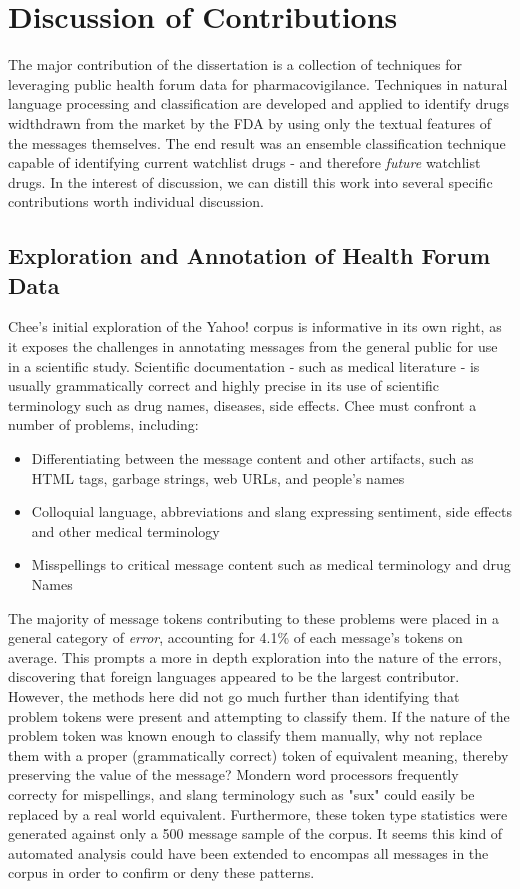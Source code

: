 \documentclass[twoside,11pt]{article}
\begin{document}
\section{Discussion of Contributions}
The major contribution of the dissertation is a collection of techniques for leveraging public health forum data for pharmacovigilance. Techniques in natural language processing and classification are developed and applied to identify drugs widthdrawn from the market by the FDA by using only the textual features of the messages themselves. The end result was an ensemble classification technique capable of identifying current watchlist drugs - and therefore \textit{future} watchlist drugs. In the interest of discussion, we can distill this work into several specific contributions worth individual discussion.

\subsection{Exploration and Annotation of Health Forum Data}
Chee's initial exploration of the Yahoo! corpus is informative in its own right, as it exposes the challenges in annotating messages from the general public for use in a scientific study. Scientific documentation - such as medical literature - is usually grammatically correct and highly precise in its use of scientific terminology such as drug names, diseases, side effects. Chee must confront a number of problems, including:
\begin{itemize}
  \item Differentiating between the message content and other artifacts, such as HTML tags, garbage strings, web URLs, and people's names
  \item Colloquial language, abbreviations and slang expressing sentiment, side effects and other medical terminology
  \item Misspellings to critical message content such as medical terminology and drug Names
\end{itemize}

The majority of message tokens contributing to these problems were placed in a general category of \textit{error}, accounting for 4.1\% of each message's tokens on average. This prompts a more in depth exploration into the nature of the errors, discovering that foreign languages appeared to be the largest contributor. However, the methods here did not go much further than identifying that problem tokens were present and attempting to classify them. If the nature of the problem token was known enough to classify them manually, why not replace them with a proper (grammatically correct) token of equivalent meaning, thereby preserving the value of the message? Mondern word processors frequently correcty for mispellings, and slang terminology such as "sux" could easily be replaced by a real world equivalent. Furthermore, these token type statistics were generated against only a 500 message sample of the corpus. It seems this kind of automated analysis could have been extended to encompas all messages in the corpus in order to confirm or deny these patterns.
\end{document}
